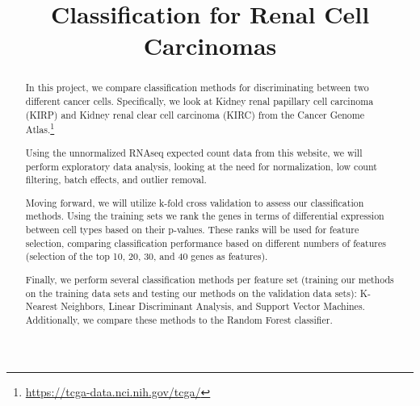 



\begin{frontmatter}

\title{Classification for Renal Cell Carcinomas}



\begin{abstract}

In this project, we compare classification methods for discriminating between
two different cancer cells. Specifically, we look at Kidney renal
papillary cell carcinoma (KIRP) and Kidney renal clear cell carcinoma (KIRC)
from the Cancer Genome Atlas.\footnote{\url{https://tcga-data.nci.nih.gov/tcga/}}

Using the unnormalized RNAseq expected count data from this website, we will
perform exploratory data analysis, looking at the need for normalization, low
count filtering, batch effects, and outlier removal.

Moving forward, we will utilize k-fold cross validation to assess our
classification methods. Using the training sets we rank the genes in terms
of differential expression between cell types based on their p-values.  These
ranks will be used for feature selection, comparing classification performance
based on different numbers of features (selection of the top 10, 20, 30, and 40
genes as features).

Finally, we perform several classification methods per feature set
(training our methods on the training data sets and testing our methods on the
validation data sets): K-Nearest Neighbors, Linear Discriminant Analysis, and
Support Vector Machines.  Additionally, we compare these methods to the
Random Forest classifier.

 
\end{abstract}

\begin{keyword}
\end{keyword}

\end{frontmatter}



